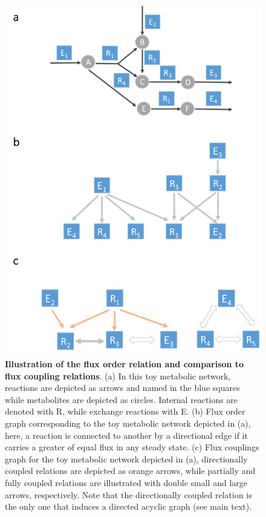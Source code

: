 \documentclass[12pt]{article}
\begin{document}
\begin{figure}
  \centering
  \includegraphics[scale=1]{Fig1.png}
  \caption{\small \textbf{Illustration of the flux order relation and comparison to flux coupling relations}. (a) In this toy metabolic network, reactions are depicted as arrows and named in the blue squares while metabolites are depicted as circles. Internal reactions are denoted with R, while exchange reactions with E. (b) Flux order graph corresponding to the toy metabolic network depicted in (a), here, a reaction is connected to another by a directional edge if it carries a greater of equal flux in any steady state. (c) Flux couplings graph for the toy metabolic network depicted in (a), directionally coupled relations are depicted as orange arrows, while partially and fully coupled relations are illustrated with double small and large arrows, respectively. Note that the directionally coupled relation is the only one that induces a directed acyclic graph (see main text).}
  \label{fig:example}
\end{figure}
\end{document}
